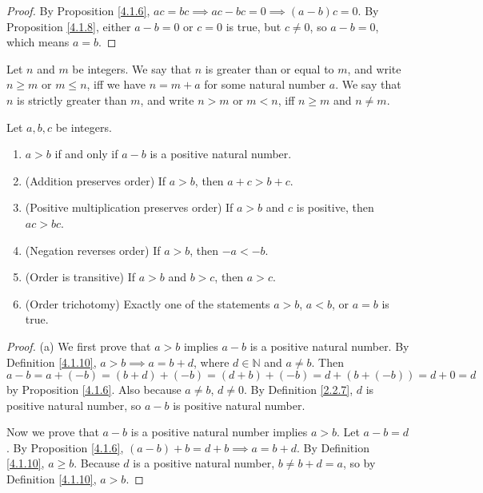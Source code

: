 \begin{proof}
By Proposition \ref{4.1.6}, \(ac = bc \implies ac - bc = 0 \implies (a - b)c = 0\).
By Proposition \ref{4.1.8}, either \(a - b = 0\) or \(c = 0\) is true, but \(c \neq 0\), so \(a - b = 0\), which means \(a = b\).
\end{proof}

\begin{definition}\label{4.1.10}
Let \(n\) and \(m\) be integers.
We say that \(n\) is greater than or equal to \(m\), and write \(n \geq m\) or \(m \leq n\), iff we have \(n = m + a\) for some natural number \(a\).
We say that \(n\) is strictly greater than \(m\), and write \(n > m\) or \(m < n\), iff \(n \geq m\) and \(n \neq m\).
\end{definition}

\begin{lemma}\label{4.1.11}
Let \(a, b, c\) be integers.
\begin{enumerate}
    \item \(a > b\) if and only if \(a - b\) is a positive natural number.
    \item (Addition preserves order) If \(a > b\), then \(a + c > b + c\).
    \item (Positive multiplication preserves order) If \(a > b\) and \(c\) is positive, then \(ac > bc\).
    \item (Negation reverses order) If \(a > b\), then \(-a < -b\).
    \item (Order is transitive) If \(a > b\) and \(b > c\), then \(a > c\).
    \item (Order trichotomy) Exactly one of the statements \(a > b\), \(a < b\), or \(a = b\) is true.
\end{enumerate}
\end{lemma}

\begin{proof}{(a)}
We first prove that \(a > b\) implies \(a - b\) is a positive natural number.
By Definition \ref{4.1.10}, \(a > b \implies a = b + d\), where \(d \in \mathds{N}\) and \(a \neq b\).
Then \(a - b = a + (-b) = (b + d) + (-b) = (d + b) + (-b) = d + (b + (-b)) = d + 0 = d\) by Proposition \ref{4.1.6}.
Also because \(a \neq b\), \(d \neq 0\).
By Definition \ref{2.2.7}, \(d\) is positive natural number, so \(a - b\) is positive natural number.

Now we prove that \(a - b\) is a positive natural number implies \(a > b\).
Let \(a - b = d\).
By Proposition \ref{4.1.6}, \((a - b) + b = d + b \implies a = b + d\).
By Definition \ref{4.1.10}, \(a \geq b\).
Because \(d\) is a positive natural number, \(b \neq b + d = a\), so by Definition \ref{4.1.10}, \(a > b\).
\end{proof}

